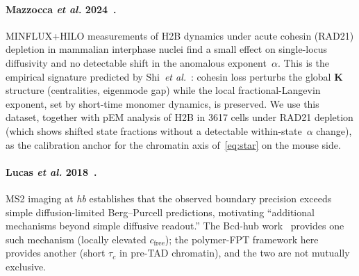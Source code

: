 \documentclass[11pt]{article}
\begin{document}
\paragraph{Mazzocca \textit{et al.} 2024~\cite{Mazzocca2024}.}
MINFLUX+HILO measurements of H2B dynamics under acute cohesin (RAD21)
depletion in mammalian interphase nuclei find a small effect on
single-locus diffusivity and no detectable shift in the anomalous
exponent~$\alpha$. This is the empirical signature predicted by
Shi~\textit{et al.}~\cite{Shi2025}: cohesin loss perturbs the global
$\mathbf{K}$ structure (centralities, eigenmode gap) while the local
fractional-Langevin exponent, set by short-time monomer dynamics, is
preserved. We use this dataset, together with pEM analysis of H2B in
3617 cells under RAD21 depletion (which shows shifted state fractions
without a detectable within-state~$\alpha$ change), as the calibration
anchor for the chromatin axis of~\eqref{eq:star} on the mouse side.

\paragraph{Lucas \textit{et al.} 2018~\cite{Lucas2018}.} MS2 imaging at
\textit{hb} establishes that the observed boundary precision exceeds simple
diffusion-limited Berg--Purcell predictions, motivating ``additional
mechanisms beyond simple diffusive readout.'' The Bcd-hub
work~\cite{Mir2017,Mir2018} provides one such mechanism (locally elevated
$c_{\mathrm{free}}$); the polymer-FPT framework here provides another
(short $\tau_c$ in pre-TAD chromatin), and the two are not mutually
exclusive.
\end{document}
